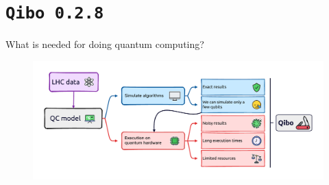 \documentclass[8pt, xcolor={svgnames}, hyperref={linkcolor=black}]{beamer}
\begin{document}
\section{\texttt{Qibo 0.2.8}}

\begin{frame}{What is needed for doing quantum computing?}
\begin{figure}
   \includegraphics[width=1\linewidth]{figures/qc_onchip.pdf}
\end{figure}  
\end{frame}
\end{document}
